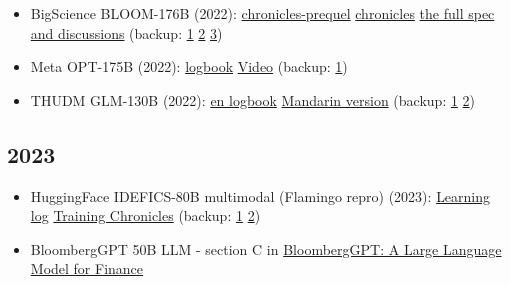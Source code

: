 \documentclass[
]{report}
\begin{document}
\begin{itemize}
\item
  BigScience BLOOM-176B (2022):
  \href{https://github.com/bigscience-workshop/bigscience/blob/master/train/tr11-176B-ml/chronicles-prequel.md}{chronicles-prequel}
  \textbar{}
  \href{https://github.com/bigscience-workshop/bigscience/blob/master/train/tr11-176B-ml/chronicles.md}{chronicles}
  \textbar{}
  \href{https://github.com/bigscience-workshop/bigscience/blob/master/train/tr11-176B-ml/}{the
  full spec and discussions} (backup:
  \href{https://github.com/stas00/bigscience-backup/blob/master/train/tr11-176B-ml/chronicles-prequel.md}{1}
  \textbar{}
  \href{https://github.com/stas00/bigscience-backup/blob/master/train/tr11-176B-ml/chronicles.md}{2}
  \textbar{}
  \href{https://github.com/stas00/bigscience-backup/blob/master/train/tr11-176B-ml/}{3})
\item
  Meta OPT-175B (2022):
  \href{https://github.com/facebookresearch/metaseq/tree/main/projects/OPT/chronicles}{logbook}
  \textbar{} \href{https://www.youtube.com/watch?v=p9IxoSkvZ-M}{Video}
  (backup:
  \href{https://github.com/stas00/metaseq-backup/tree/main/projects/OPT/chronicles}{1})
\item
  THUDM GLM-130B (2022):
  \href{https://github.com/THUDM/GLM-130B/blob/main/logs/main-log-en.md}{en
  logbook} \textbar{}
  \href{https://github.com/THUDM/GLM-130B/blob/main/logs/main-log.md}{Mandarin
  version} (backup:
  \href{https://github.com/stas00/GLM-130B-backup/blob/main/logs/main-log-en.md}{1}
  \textbar{}
  \href{https://github.com/stas00/GLM-130B-backup/blob/main/logs/main-log.md}{2})
\end{itemize}

\subsection{2023}\label{section-2}

\begin{itemize}
\item
  HuggingFace IDEFICS-80B multimodal (Flamingo repro) (2023):
  \href{https://github.com/huggingface/m4-logs/blob/master/memos/README.md}{Learning
  log} \textbar{}
  \href{https://github.com/huggingface/m4-logs/blob/master/tr-190-80b/chronicles.md}{Training
  Chronicles} (backup:
  \href{https://github.com/stas00/m4-logs-backup/blob/master/memos/README.md}{1}
  \textbar{}
  \href{https://github.com/stas00/m4-logs-backup/blob/master/tr-190-80b/chronicles.md}{2})
\item
  BloombergGPT 50B LLM - section C in
  \href{https://arxiv.org/abs/2303.17564}{BloombergGPT: A Large Language
  Model for Finance}
\end{itemize}
\end{document}
